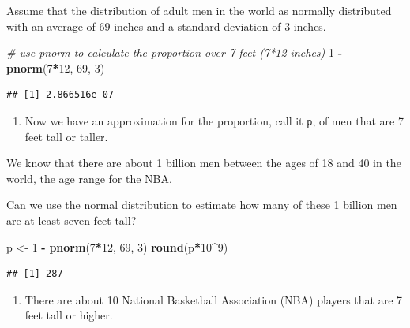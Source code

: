 \documentclass[
]{article}
\newenvironment{Shaded}{\begin{snugshade}}{\end{snugshade}}
\newcommand{\CommentTok}[1]{\textcolor[rgb]{0.56,0.35,0.01}{\textit{#1}}}
\newcommand{\DecValTok}[1]{\textcolor[rgb]{0.00,0.00,0.81}{#1}}
\newcommand{\KeywordTok}[1]{\textcolor[rgb]{0.13,0.29,0.53}{\textbf{#1}}}
\newcommand{\NormalTok}[1]{#1}
\newcommand{\OperatorTok}[1]{\textcolor[rgb]{0.81,0.36,0.00}{\textbf{#1}}}
\newcommand{\StringTok}[1]{\textcolor[rgb]{0.31,0.60,0.02}{#1}}
\providecommand{\tightlist}{%
  \setlength{\itemsep}{0pt}\setlength{\parskip}{0pt}}
\begin{document}
Assume that the distribution of adult men in the world as normally
distributed with an average of 69 inches and a standard deviation of 3
inches.

\begin{Shaded}
\begin{Highlighting}[]
\CommentTok{# use pnorm to calculate the proportion over 7 feet (7*12 inches)}
\DecValTok{1} \OperatorTok{-}\StringTok{ }\KeywordTok{pnorm}\NormalTok{(}\DecValTok{7}\OperatorTok{*}\DecValTok{12}\NormalTok{, }\DecValTok{69}\NormalTok{, }\DecValTok{3}\NormalTok{)}
\end{Highlighting}
\end{Shaded}

\begin{verbatim}
## [1] 2.866516e-07
\end{verbatim}

\begin{enumerate}
\def\labelenumi{\arabic{enumi}.}
\setcounter{enumi}{4}
\tightlist
\item
  Now we have an approximation for the proportion, call it \texttt{p},
  of men that are 7 feet tall or taller.
\end{enumerate}

We know that there are about 1 billion men between the ages of 18 and 40
in the world, the age range for the NBA.

Can we use the normal distribution to estimate how many of these 1
billion men are at least seven feet tall?

\begin{Shaded}
\begin{Highlighting}[]
\NormalTok{p <-}\StringTok{ }\DecValTok{1} \OperatorTok{-}\StringTok{ }\KeywordTok{pnorm}\NormalTok{(}\DecValTok{7}\OperatorTok{*}\DecValTok{12}\NormalTok{, }\DecValTok{69}\NormalTok{, }\DecValTok{3}\NormalTok{)}
\KeywordTok{round}\NormalTok{(p}\OperatorTok{*}\DecValTok{10}\OperatorTok{^}\DecValTok{9}\NormalTok{)}
\end{Highlighting}
\end{Shaded}

\begin{verbatim}
## [1] 287
\end{verbatim}

\begin{enumerate}
\def\labelenumi{\arabic{enumi}.}
\setcounter{enumi}{5}
\tightlist
\item
  There are about 10 National Basketball Association (NBA) players that
  are 7 feet tall or higher.
\end{enumerate}
\end{document}
